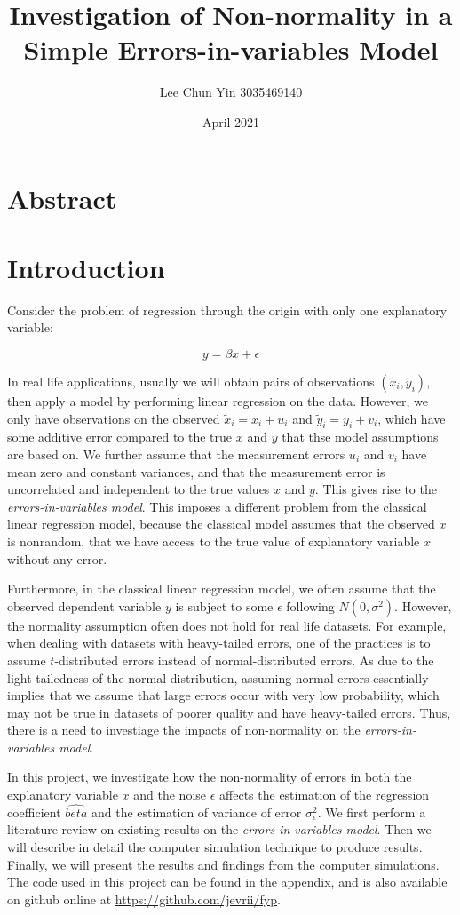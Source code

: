 \documentclass{article}
\title{Investigation of Non-normality in a Simple Errors-in-variables Model}
\author{Lee Chun Yin 3035469140}
\date{April 2021}
\begin{document}
\maketitle

\section{Abstract}

\section{Introduction}

Consider the problem of regression through the origin with only one explanatory variable:

\[
y = \beta x + \epsilon
\]

In real life applications, usually we will obtain pairs of observations $(\tilde{x}_i, \tilde{y}_i)$, then apply a model by performing linear regression on the data. However, we only have observations on the observed $\tilde{x}_i = x_i + u_i$ and $\tilde{y}_i = y_i + v_i$, which have some additive error compared to the true $x$ and $y$ that thse model assumptions are based on. We further assume that the measurement errors $u_i$ and $v_i$ have mean zero and constant variances, and that the
measurement error is uncorrelated and independent to the true values $x$ and $y$. This gives rise to the \textit{errors-in-variables model}. This imposes a different problem from the classical linear regression model, because the classical model assumes that the observed $\tilde{x}$ is nonrandom, that we have access to the true value of explanatory variable $x$ without any error. 

Furthermore, in the classical linear regression model, we often assume that the observed dependent variable $y$ is subject to some $\epsilon$ following $N(0, \sigma^2)$. However, the normality assumption often does not hold for real life datasets. For example, when dealing with datasets with heavy-tailed errors, one of the practices is to assume $t$-distributed errors instead of normal-distributed errors. As due to the light-tailedness of the normal distribution, assuming normal errors
essentially implies that we assume that large errors occur with very low probability, which may not be true in datasets of poorer quality and have heavy-tailed errors. Thus, there is a need to investiage the impacts of non-normality on the \textit{errors-in-variables model}.

In this project, we investigate how the non-normality of errors in both the explanatory variable $x$ and the noise $\epsilon$ affects the estimation of the regression coefficient $\hat{beta}$ and the estimation of variance of error $\sigma^2_\epsilon$. We first perform a literature review on existing results on the \textit{errors-in-variables model}. Then we will describe in detail the computer simulation technique to produce results. Finally, we will present the results and findings from
the computer simulations. The code used in this project can be found in the appendix, and is also available on github online at \url{https://github.com/jevrii/fyp}.
\end{document}

